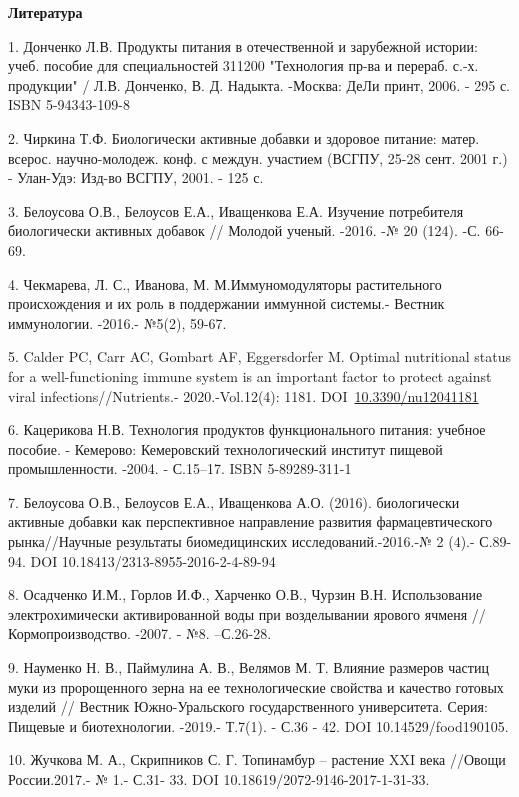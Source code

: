 \begin{center}
{\bfseries Литература}
\end{center}

\begin{references}
1. Донченко Л.В. Продукты питания в отечественной и зарубежной истории:
учеб. пособие для специальностей 311200 "Технология пр-ва и перераб.
с.-х. продукции" / Л.В. Донченко, В. Д. Надыкта. -Москва: ДеЛи принт,
2006. - 295 с. ISBN 5-94343-109-8

2. Чиркина Т.Ф. Биологически активные добавки и здоровое питание: матер.
всерос. научно-молодеж. конф. с междун. участием (ВСГПУ, 25-28 сент.
2001 г.) - Улан-Удэ: Изд-во ВСГПУ, 2001. - 125 с.

3. Белоусова О.В., Белоусов Е.А., Иващенкова Е.А. Изучение потребителя
биологически активных добавок // Молодой ученый. -2016. -№ 20 (124). -С.
66-69.

4. Чекмарева, Л. С., Иванова, М. М.Иммуномодуляторы растительного
происхождения и их роль в поддержании иммунной системы.- Вестник
иммунологии. -2016.- №5(2), 59-67.

5. Calder PC, Carr AC, Gombart AF, Eggersdorfer M. Optimal nutritional
status for a well-functioning immune system is an important factor to
protect against viral infections//Nutrients.- 2020.-Vol.12(4): 1181.
DOI~\href{https://doi.org/10.3390/nu12041181}{10.3390/nu12041181}

6. Кацерикова Н.В. Технология продуктов функционального питания: учебное
пособие. - Кемерово: Кемеровский технологический институт пищевой
промышленности. -2004. - С.15--17. ISBN 5-89289-311-1

7. Белоусова О.В., Белоусов Е.А., Иващенкова А.О. (2016). биологически
активные добавки как перспективное направление развития
фармацевтического рынка//Научные результаты биомедицинских
исследований.-2016.-№ 2 (4).- С.89-94. DOI
10.18413/2313-8955-2016-2-4-89-94

8. Осадченко И.М., Горлов И.Ф., Харченко О.В., Чурзин В.Н. Использование
электрохимически активированной воды при возделывании ярового ячменя
//Кормопроизводство. -2007. - №8. --С.26-28.

9. Науменко Н. В., Паймулина А. В., Велямов М. Т. Влияние размеров частиц
муки из пророщенного зерна на ее технологические свойства и качество
готовых изделий // Вестник Южно-Уральского государственного
университета. Серия: Пищевые и биотехнологии. -2019.- Т.7(1). - С.36 -
42. DOI 10.14529/food190105.

10. Жучкова М. А., Скрипников С. Г. Топинамбур -- растение XXI века
//Овощи России.2017.- № 1.- С.31- 33. DOI
10.18619/2072-9146-2017-1-31-33.
\end{references}

